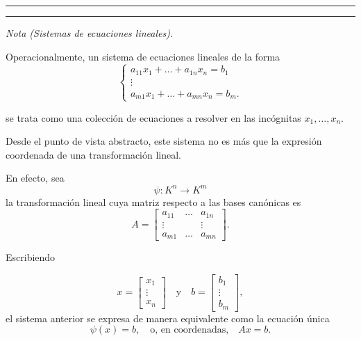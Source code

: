 \medskip
\hrule
\bigskip


\bigskip
\hrule
\medskip

\textit{Nota (Sistemas de ecuaciones lineales).}

Operacionalmente, un sistema de ecuaciones lineales de la forma
\[
\begin{cases}
a_{11} x_1 + \dots + a_{1n} x_n = b_1\\
\vdots\\
a_{m1} x_1 + \dots + a_{mn} x_n = b_m.
\end{cases}
\]

se trata como una colección de ecuaciones a resolver en las incógnitas
\(
x_1,\dots,x_n.
\)

\medskip

Desde el punto de vista abstracto, este sistema no es más que la expresión coordenada de una transformación lineal.

\medskip

En efecto, sea
\[
\psi : K^n \longrightarrow K^m
\]
la transformación lineal cuya matriz respecto a las bases canónicas es
\[
A =
\begin{bmatrix}
a_{11} & \dots & a_{1n}\\
\vdots & & \vdots\\
a_{m1} & \dots & a_{mn}
\end{bmatrix}.
\]

\medskip

Escribiendo

\[
x =
\begin{bmatrix}
x_1\\
\vdots\\
x_n
\end{bmatrix}
\quad\text{y}\quad
b =
\begin{bmatrix}
b_1\\
\vdots\\
b_m
\end{bmatrix},
\]
el sistema anterior se expresa de manera equivalente como la ecuación única
\[
\psi(x) = b,
\quad\text{o, en coordenadas,}\quad
A x = b.
\]

